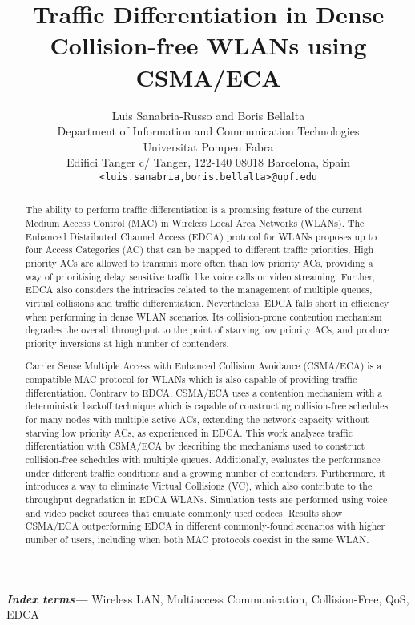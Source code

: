 \documentclass[a4paper]{article}
\title{Traffic Differentiation in Dense Collision-free WLANs using CSMA/ECA}
\author{Luis Sanabria-Russo and Boris Bellalta\\ Department of Information and Communication Technologies \\ Universitat Pompeu Fabra\\ Edifici Tanger
c/ Tanger, 122-140 08018 Barcelona, Spain \\ \texttt{<luis.sanabria,boris.bellalta>@upf.edu}}
\providecommand{\keywords}[1]{\textbf{\textit{Index terms---}} #1}
\begin{document}
\maketitle

\begin{abstract}
The ability to perform traffic differentiation is a promising feature of the current Medium Access Control (MAC) in Wireless Local Area Networks (WLANs). The Enhanced Distributed Channel Access (EDCA) protocol for WLANs proposes up to four Access Categories (AC) that can be mapped to different traffic priorities. High priority ACs are allowed to transmit more often than low priority ACs, providing a way of prioritising delay sensitive traffic like voice calls or video streaming. Further, EDCA also considers the intricacies related to the management of multiple queues, virtual collisions and traffic differentiation. Nevertheless, EDCA falls short in efficiency when performing in dense WLAN scenarios. Its collision-prone contention mechanism degrades the overall throughput to the point of starving low priority ACs, and produce priority inversions at high number of contenders.

Carrier Sense Multiple Access with Enhanced Collision Avoidance (CSMA/ECA) is a compatible MAC protocol for WLANs which is also capable of providing traffic differentiation. Contrary to EDCA, CSMA/ECA uses a contention mechanism with a deterministic backoff technique which is capable of constructing collision-free schedules for many nodes with multiple active ACs, extending the network capacity without starving low priority ACs, as experienced in EDCA. This work analyses traffic differentiation with CSMA/ECA by describing the mechanisms used to construct collision-free schedules with multiple queues. Additionally, evaluates the performance under different traffic conditions and a growing number of contenders. Furthermore, it introduces a way to eliminate Virtual Collisions (VC), which also contribute to the throughput degradation in EDCA WLANs. Simulation tests are performed using voice and video packet sources that emulate commonly used codecs. Results show CSMA/ECA outperforming EDCA in different commonly-found scenarios with higher number of users, including when both MAC protocols coexist in the same WLAN.
\end{abstract}

\keywords{Wireless LAN, Multiaccess Communication, Collision-Free, QoS, EDCA}
\end{document}
